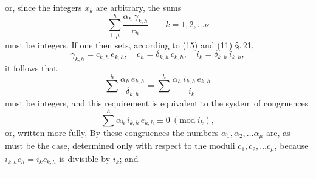 or, since the integers $x_k$ are arbitrary, the sums
\[
\sum_{1,\mu}^{h}\frac{\alpha_h\,\gamma_{k,h}}{c_h}\qquad k=1,2,\ldots \nu
\]
must be integers. If one then sets, according to (15) and (11) \S.\,21,
\[
\gamma_{k,h}=c_{k,h}\,e_{k,h},\quad c_h=\delta_{k,h}\,c_{k,h},\quad i_k=\delta_{k,h}\,i_{k,h},
\]
it follows that
\[
\sum^{h}\frac{\alpha_h\,e_{k,h}}{\delta_{k,h}}=\sum^{h}\frac{\alpha_h\,i_{k,h}\,e_{k,h}}{i_k}
\]
must be integers, and this requirement is equivalent to the system of congruences
\[
\sum^h \alpha_h\,i_{k,h}\,e_{k,h}\equiv 0\ (\mathrm{mod}\ i_k),
\]
or, written more fully,
By these congruences the numbers $\alpha_1, \alpha_2, \ldots \alpha_\mu$ are, as must be the case, determined only with respect to the moduli $c_1, c_2, \ldots c_\mu$, because $i_{k,h}c_h=i_k c_{k,h}$ is divisible by $i_k$; and 

\begin{center}
\rule{4cm}{0.4pt}
\end{center}
